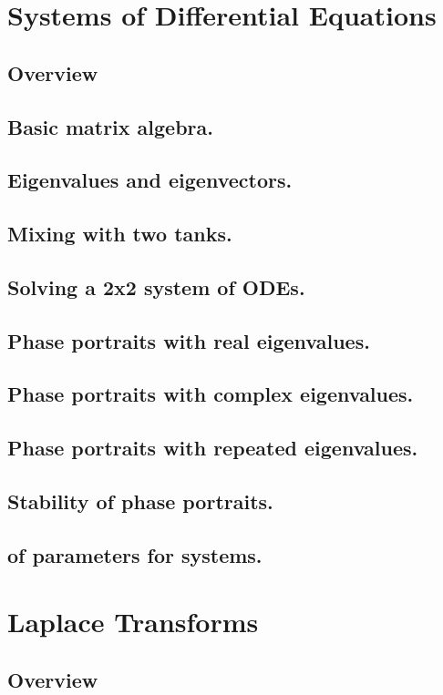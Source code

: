 \documentclass{article}
\begin{document}
\pagebreak

\section{Systems of Differential Equations}
\subsection*{Overview}

\subsection{Basic matrix algebra.}
\subsection{Eigenvalues and eigenvectors.}
\subsection{Mixing with two tanks.}
\subsection{Solving a 2x2 system of ODEs.}
\subsection{Phase portraits with real eigenvalues.}
\subsection{Phase portraits with complex eigenvalues.}
\subsection{Phase portraits with repeated eigenvalues.}
\subsection{Stability of phase portraits.}
\subsection{of parameters for systems.}

\pagebreak
\section{Laplace Transforms}
\subsection*{Overview}
\end{document}
